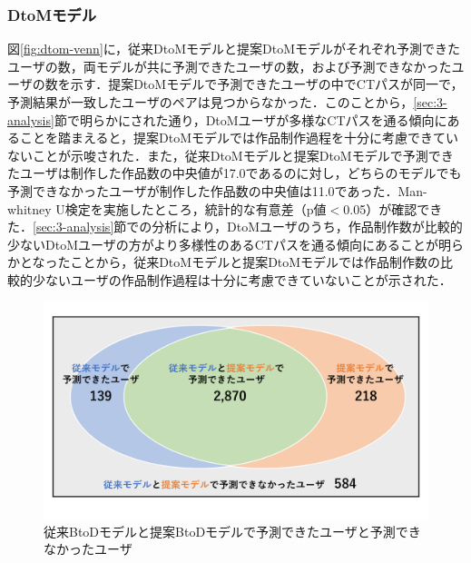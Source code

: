 \documentclass[11pt,dvipdfmx]{jreport}
\begin{document}
\subsubsection*{DtoMモデル}

図\ref{fig:dtom-venn}に，従来DtoMモデルと提案DtoMモデルがそれぞれ予測できたユーザの数，両モデルが共に予測できたユーザの数，および予測できなかったユーザの数を示す．提案DtoMモデルで予測できたユーザの中でCTパスが同一で，予測結果が一致したユーザのペアは見つからなかった．このことから，\ref{sec:3-analysis}節で明らかにされた通り，DtoMユーザが多様なCTパスを通る傾向にあることを踏まえると，提案DtoMモデルでは作品制作過程を十分に考慮できていないことが示唆された．また，従来DtoMモデルと提案DtoMモデルで予測できたユーザは制作した作品数の中央値が17.0であるのに対し，どちらのモデルでも予測できなかったユーザが制作した作品数の中央値は11.0であった．Man-whitney U検定を実施したところ，統計的な有意差（p値$<$0.05）が確認できた．\ref{sec:3-analysis}節での分析により，DtoMユーザのうち，作品制作数が比較的少ないDtoMユーザの方がより多様性のあるCTパスを通る傾向にあることが明らかとなったことから，従来DtoMモデルと提案DtoMモデルでは作品制作数の比較的少ないユーザの作品制作過程は十分に考慮できていないことが示された．

\begin{figure}[t]
	\centering
	\includegraphics[width=1.0\linewidth]{Okamoto_fig/btod-venn.pdf}
        \vspace{-15mm}
	\caption{従来BtoDモデルと提案BtoDモデルで予測できたユーザと予測できなかったユーザ}
	\label{fig:btod-venn}
\end{figure}
\end{document}
